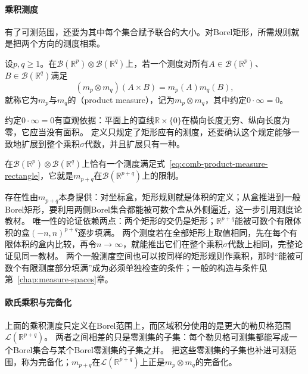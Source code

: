 \paragraph{乘积测度}

有了可测范围，还要为其中每个集合赋予联合的大小。对Borel矩形，所需规则就是把两个方向的测度相乘。

\begin{definition}[乘积测度]
\label{def:analysis-product-measure}
设$p,q\geq1$。在$\mathcal B(\mathbb R^p)\otimes\mathcal B(\mathbb R^q)$上，若一个测度对所有$A\in\mathcal B(\mathbb R^p)$、$B\in\mathcal B(\mathbb R^q)$满足
\begin{equation}
 (m_p\otimes m_q)(A\times B)=m_p(A)m_q(B),
 \label{eq:comb-product-measure-rectangle}
\end{equation}
就称它为$m_p$与$m_q$的（product measure），记为$m_p\otimes m_q$，其中约定$0\cdot\infty=0$。
\end{definition}

约定$0\cdot\infty=0$有直观依据：平面上的直线$\mathbb R\times\{0\}$在横向长度无穷、纵向长度为零，它应当没有面积。
定义只规定了矩形应有的测度，还要确认这个规定能够一致地扩展到整个乘积$\sigma$代数，并且扩展只有一种。

\begin{theorem}[乘积测度的存在唯一性]
在$\mathcal B(\mathbb R^p)\otimes\mathcal B(\mathbb R^q)$上恰有一个测度满足式~\eqref{eq:comb-product-measure-rectangle}，它就是$m_{p+q}$在$\mathcal B(\mathbb R^{p+q})$上的限制。
\end{theorem}

存在性由$m_{p+q}$本身提供：对坐标盒，矩形规则就是体积的定义；从盒推进到一般Borel矩形，要利用两侧Borel集合都能被可数个盒从外侧逼近，这一步引用测度论教材。
唯一性的论证依赖两点：两个矩形的交仍是矩形；$\mathbb R^{p+q}$能被可数个有限体积的盒$(-n,n)^{p+q}$逐步填满。
两个测度若在全部矩形上取值相同，先在每个有限体积的盒内比较，再令$n\to\infty$，就能推出它们在整个乘积$\sigma$代数上相同，完整论证见同一教材。
两个一般测度空间也可以按同样的矩形规则作乘积，那时“能被可数个有限测度部分填满”成为必须单独检查的条件；一般的构造与条件见第~\ref{chap:measure-spaces}章。

\paragraph{欧氏乘积与完备化}

上面的乘积测度只定义在Borel范围上，而区域积分使用的是更大的勒贝格范围$\mathcal L(\mathbb R^{p+q})$。
两者之间相差的只是零测集的子集：每个勒贝格可测集都能写成一个Borel集合与某个Borel零测集的子集之并。
把这些零测集的子集也补进可测范围，称为完备化；$m_{p+q}$在$\mathcal L(\mathbb R^{p+q})$上正是$m_p\otimes m_q$的完备化。

